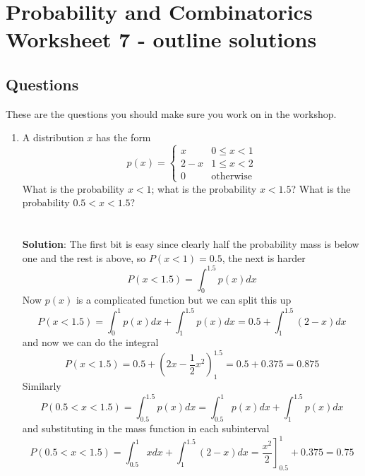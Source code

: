 \documentclass[11pt,a4paper]{scrartcl}
\begin{document}
\section*{Probability and Combinatorics Worksheet 7 - outline solutions}

\subsection*{Questions}

These are the questions you should make sure you work on in the workshop.

\begin{enumerate}

\item A distribution $x$ has the form
\begin{equation}
p(x)=\left\{\begin{array}{cc}x& 0\le x <1\\2-x& 1\le x<2\\0&\mbox{otherwise}\end{array}\right.
\end{equation}
What is the probability $x<1$; what is the probability $x<1.5$? What is the probability $0.5<x<1.5$?\\
\\
\\
\textbf{Solution}: The first bit is easy since clearly half the probability mass is below one and the rest is above, so $P(x<1)=0.5$, the next is harder
\begin{equation}
  P(x<1.5)=\int_0^{1.5}p(x)dx
\end{equation}
Now $p(x)$ is a complicated function but we can split this up
\begin{equation}
  P(x<1.5)=\int_0^{1}p(x)dx+\int_1^{1.5}p(x)dx=0.5+\int_1^{1.5}(2-x)dx
\end{equation}
and now we can do the integral
\begin{equation}
  P(x<1.5)=0.5+\left(2x-\frac{1}{2}x^2\right)_1^{1.5}=0.5+0.375=0.875
\end{equation}
Similarly
\begin{equation}
  P(0.5<x<1.5)=\int_{0.5}^{1.5}p(x)dx=\int_{0.5}^{1}p(x)dx+\int_1^{1.5}p(x)dx
\end{equation}
and substituting in the mass function in each subinterval
\begin{equation}
  P(0.5<x<1.5)=\int_{0.5}^{1}xdx+\int_1^{1.5}(2-x)dx=\left.\frac{x^2}{2}\right]_{0.5}^1+0.375=0.75
\end{equation}


\end{enumerate}
\end{document}
